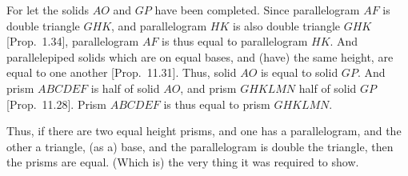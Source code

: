 For let the solids $AO$ and $GP$ have been completed. 
Since parallelogram $AF$ is double triangle $GHK$, and parallelogram
$HK$ is also double triangle $GHK$ [Prop.~1.34],
parallelogram $AF$ is thus equal to parallelogram $HK$. And parallelepiped
solids which are on equal bases, and (have) the same height, are equal
to one another [Prop.~11.31]. Thus, solid
$AO$ is equal to solid $GP$.  And prism $ABCDEF$ is half of solid
$AO$, and prism $GHKLMN$ half of solid $GP$ [Prop.~11.28]. Prism $ABCDEF$ is thus equal to prism $GHKLMN$.

Thus, if there are two equal height prisms,
and one has a parallelogram, and the other a triangle,  (as a) base, 
and the parallelogram is double the triangle, then the prisms are equal.
(Which is) the very thing it was required to show.